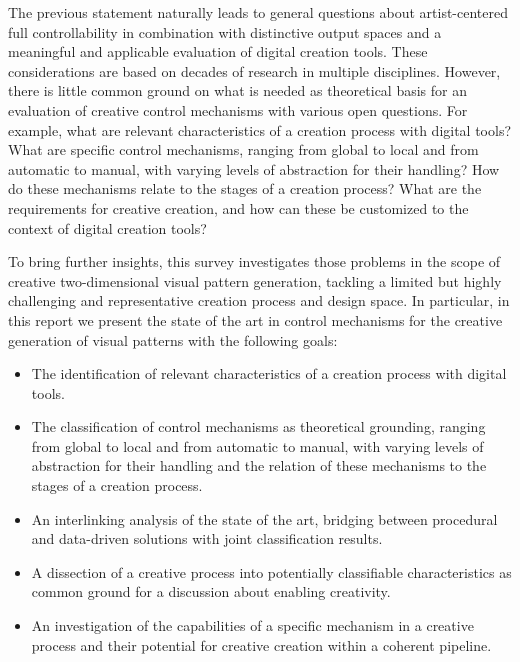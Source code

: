 The previous statement naturally leads to general questions about artist-centered full controllability in combination with distinctive output spaces and a meaningful and applicable evaluation of digital creation tools. These considerations are based on decades of research in multiple disciplines. However, there is little common ground on what is needed as theoretical basis for an evaluation of creative control mechanisms with various open questions. For example, what are relevant characteristics of a creation process with digital tools? What are specific control mechanisms, ranging from global to local and from automatic to manual, with varying levels of abstraction for their handling? How do these mechanisms relate to the stages of a creation process? What are the requirements for creative creation, and how can these be customized to the context of digital creation tools?

To bring further insights, this survey investigates those problems in the scope of creative two-dimensional visual pattern generation, tackling a limited but highly challenging and representative creation process and design space. In particular, in this report we present the state of the art in control mechanisms for the creative generation of visual patterns with the following goals:


\begin{itemize}
    \item The identification of relevant characteristics of a creation process with digital tools.
    \item The classification of control mechanisms as theoretical grounding, ranging from global to local and from automatic to manual, with varying levels of abstraction for their handling and the relation of these mechanisms to the stages of a creation process. 
    \item An interlinking analysis of the state of the art, bridging between procedural and data-driven solutions with joint classification results. 
    \item A dissection of a creative process into potentially classifiable characteristics as common ground for a discussion about enabling creativity.
    \item An investigation of the capabilities of a specific mechanism in a creative process and their potential for creative creation within a coherent pipeline.
\end{itemize}



